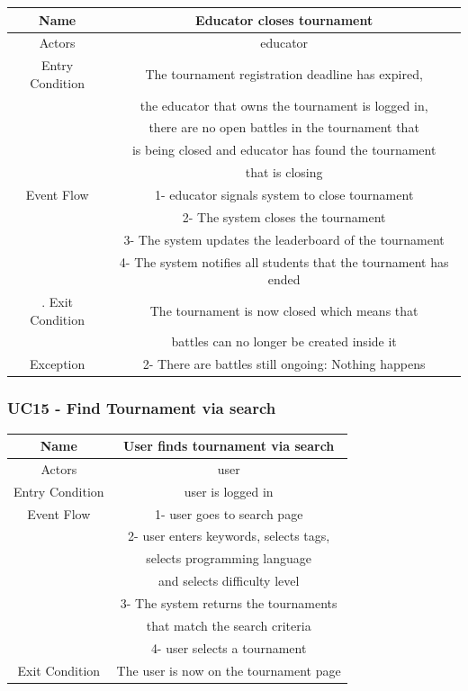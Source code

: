 \documentclass{article}
\begin{document}
\begin{tabular*}{\linewidth}{@{\extracolsep{\fill}} cc }
    \hline
    Name & Educator closes tournament\\ 
    \hline
    Actors & educator\\ 
    \hline
    Entry Condition & The tournament registration deadline has expired,\\
                    & the educator that owns the tournament is logged in,\\
                    & there are no open battles in the tournament that\\
                    & is being closed and educator has found the tournament\\
                    & that is closing\\
    \hline
    Event Flow & 1- educator signals system to close tournament\\
               & 2- The system closes the tournament\\
               & 3- The system updates the leaderboard of the tournament\\
               & 4- The system notifies all students that the tournament has ended\\
    \hline.
    Exit Condition  & The tournament is now closed which means that\\
                    & battles can no longer be created inside it\\
                
    \hline
    Exception & 2- There are battles still ongoing: Nothing happens\\
    \hline
\end{tabular*}

\subsubsection*{UC15 - Find Tournament via search}

\begin{tabular*}{\linewidth}{@{\extracolsep{\fill}} cc }
    \hline
    Name & User finds tournament via search\\ 
    \hline
    Actors & user\\ 
    \hline
    Entry Condition & user is logged in\\
    \hline
    Event Flow & 1- user goes to search page\\
               & 2- user enters keywords, selects tags, \\
               & selects programming language\\
               & and selects difficulty level\\
               & 3- The system returns the tournaments \\
               & that match the search criteria\\
               & 4- user selects a tournament\\
    \hline
    Exit Condition & The user is now on the tournament page\\ 
    \hline
\end{tabular*}
\end{document}
